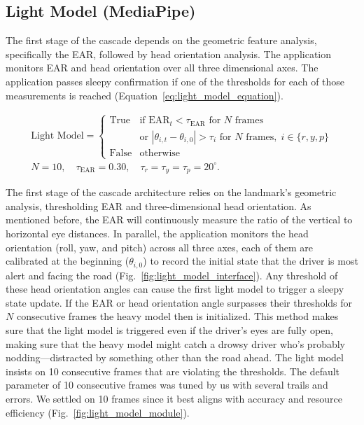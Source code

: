 \documentclass[pdflatex,sn-mathphys-num]{sn-jnl}
\theoremstyle{thmstyleone}%
\theoremstyle{thmstyletwo}%
\theoremstyle{thmstylethree}%
\begin{document}
	\subsection{Light Model (MediaPipe)}\label{sec:light}
	The first stage of the cascade depends on the geometric feature analysis, specifically the EAR, followed by head orientation analysis.
	The application monitors EAR and head orientation over all three dimensional axes. The application passes sleepy confirmation if one of the thresholds for each of those measurements is reached (Equation~\ref{eq:light_model_equation}).
	
	\begin{equation}
		\label{eq:light_model_equation}
		\begin{gathered}
			\text{Light Model} =
			\begin{cases}
				\mathrm{True} & \text{if } \mathrm{EAR}_t < \tau_{\mathrm{EAR}} \text{ for } N \text{ frames} \\
				& \text{or } |\theta_{i,t} - \theta_{i,0}| > \tau_i \text{ for } N \text{ frames}, \; i \in \{r, y, p\} \\
				\mathrm{False} & \text{otherwise}
			\end{cases} \\
			N = 10, \quad \tau_{\mathrm{EAR}} = 0.30, \quad \tau_r = \tau_y = \tau_p = 20^\circ.
		\end{gathered}
	\end{equation}
	
	The first stage of the cascade architecture relies on the landmark's geometric analysis, thresholding EAR and three-dimensional head orientation. As mentioned before, the EAR will continuously measure the ratio of the vertical to horizontal eye distances. In parallel, the application monitors the head orientation (roll, yaw, and pitch) across all three axes, each of them are calibrated at the beginning ($\theta_{i,0}$) to record the initial state that the driver is most alert and facing the road (Fig.~\ref{fig:light_model_interface}). Any threshold of these head orientation angles can cause the first light model to trigger a sleepy state update. If the EAR or head orientation angle surpasses their thresholds for $N$ consecutive frames the heavy model then is initialized. This method makes sure that the light model is triggered even if the driver's eyes are fully open, making sure that the heavy model might catch a drowsy driver who's probably nodding---distracted by something other than the road ahead. The light model insists on 10 consecutive frames that are violating the thresholds. The default parameter of 10 consecutive frames was tuned by us with several trails and errors. We settled on 10 frames since it best aligns with accuracy and resource efficiency  (Fig.~\ref{fig:light_model_module}).
	
\end{document}
